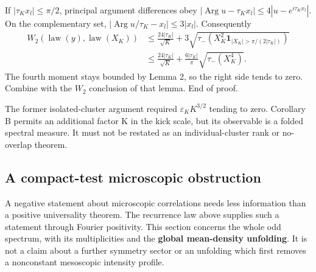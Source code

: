 If \(|\tau_Kx_l|\leq\pi/2\), principal argument differences obey \(|\operatorname{Arg}u-\tau_Kx_l|\leq4|u-e^{i\tau_Kx_l}|\). On the complementary set, \(|\operatorname{Arg}u/\tau_K-x_l|\leq3|x_l|\). Consequently \[
 \begin{split}
 W_2(\operatorname{law}(y),\operatorname{law}(X_K))
 &\leq\frac{24|\tau_K|}{\sqrt K}
   +3\sqrt{\tau_-\!\left(X_K^2
       \mathbf1_{|X_K|>\pi/(2|\tau_K|)}\right)}\\
 &\leq\frac{24|\tau_K|}{\sqrt K}
       +\frac{6|\tau_K|}{\pi}\sqrt{\tau_-(X_K^4)}.
 \end{split}\tag{FN.22}
\] The fourth moment stays bounded by Lemma 2, so the right side tends to zero. Combine with the \(W_{2}\) conclusion of that lemma. End of proof.

The former isolated-cluster argument required \(\varepsilon_KK^{3/2}\) tending to zero. Corollary B permits an additional factor K in the kick scale, but its observable is a folded spectral measure. It must not be restated as an individual-cluster rank or no-overlap theorem.

\subsection{A compact-test microscopic obstruction}\label{floquet:a-compact-test-microscopic-obstruction}

A negative statement about microscopic correlations needs less information than a positive universality theorem. The recurrence law above supplies such a statement through Fourier positivity. This section concerns the whole odd spectrum, with its multiplicities and the \textbf{global mean-density unfolding}. It is not a claim about a further symmetry sector or an unfolding which first removes a nonconstant mesoscopic intensity profile.


